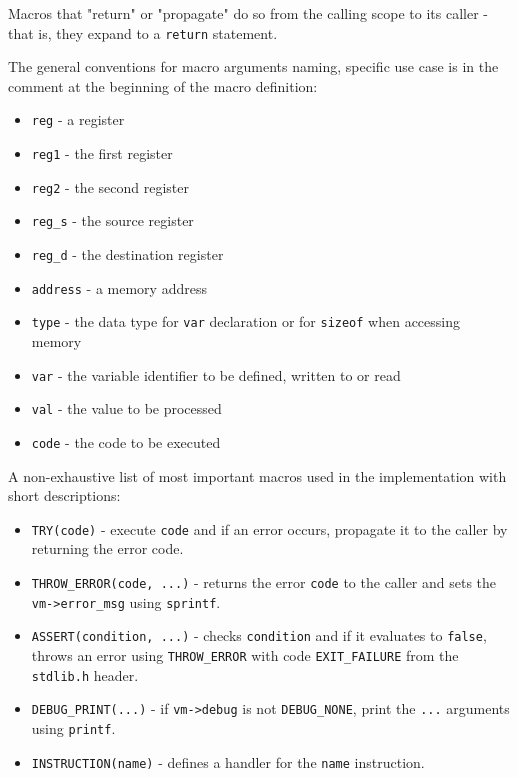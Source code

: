 \documentclass[12pt,a4paper]{paper}
\newcommand{\code}[1]{\texttt{#1}}
\begin{document}
Macros that "return" or "propagate" do so from the calling scope to its caller -
that is, they expand to a \code{return} statement.

The general conventions for macro arguments naming, specific use case is in the
comment at the beginning of the macro definition:

\begin{itemize}
\item \code{reg} - a register
\item \code{reg1} - the first register
\item \code{reg2} - the second register
\item \code{reg_s} - the source register
\item \code{reg_d} - the destination register
\item \code{address} - a memory address
\item \code{type} - the data type for \code{var} declaration or for
    \code{sizeof} when accessing memory
\item \code{var} - the variable identifier to be defined, written to or read
\item \code{val} - the value to be processed
\item \code{code} - the code to be executed
\end{itemize}

A non-exhaustive list of most important macros used in the implementation with
short descriptions:

\begin{itemize}
\item \code{TRY(code)} - execute \code{code} and if an error occurs, propagate
    it to the caller by returning the error code.
\item \code{THROW_ERROR(code, ...)} - returns the error \code{code} to the
    caller and sets the \code{vm->error_msg} using \code{sprintf}.
\item \code{ASSERT(condition, ...)} - checks \code{condition} and if it
    evaluates to \code{false}, throws an error using \code{THROW_ERROR} with
    code \code{EXIT_FAILURE} from the \code{stdlib.h} header.

\item \code{DEBUG_PRINT(...)} - if \code{vm->debug} is not \code{DEBUG_NONE},
    print the \code{...} arguments using \code{printf}.

\item \code{INSTRUCTION(name)} - defines a handler for the \code{name}
    instruction.
\end{itemize}
\end{document}
